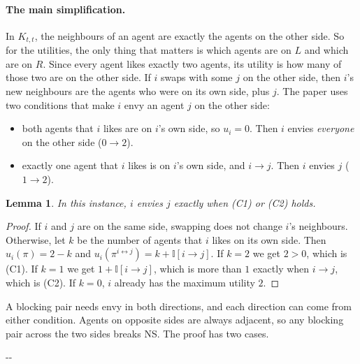 \documentclass[11pt,a4paper]{article}
\makeatletter
\newcommand{\needspace}[1]{\par\penalty-100\begingroup\setlength{\dimen@}{#1}\dimen@ii\pagegoal\advance\dimen@ii-\pagetotal\ifdim\dimen@>\dimen@ii\ifdim\dimen@ii>\z@\vfil\fi\penalty-\@M\fi\endgroup}
\theoremstyle{definition}
\theoremstyle{remark}
\theoremstyle{plain}
\newtheorem*{ourlemma}{Lemma}
\makeatother
\begin{document}
\paragraph{The main simplification.} In $K_{t,t}$, the neighbours of an agent are exactly the agents on the other side. So for the utilities, the only thing that matters is which agents are on $L$ and which are on $R$. Since every agent likes exactly two agents, its utility is how many of those two are on the other side. If $i$ swaps with some $j$ on the other side, then $i$'s new neighbours are the agents who were on its own side, plus $j$. The paper uses two conditions that make $i$ envy an agent $j$ on the other side:
\begin{itemize}
  \item[(C1)] both agents that $i$ likes are on $i$'s own side, so $u_i=0$. Then $i$ envies \emph{everyone} on the other side ($0\to2$).
  \item[(C2)] exactly one agent that $i$ likes is on $i$'s own side, and $i\to j$. Then $i$ envies $j$ ($1\to2$).
\end{itemize}

\begin{ourlemma}
In this instance, $i$ envies $j$ exactly when (C1) or (C2) holds.
\end{ourlemma}
\begin{proof}
If $i$ and $j$ are on the same side, swapping does not change $i$'s neighbours. Otherwise, let $k$ be the number of agents that $i$ likes on its own side. Then $u_i(\pi)=2-k$ and $u_i(\pi^{i\leftrightarrow j})=k+\mathbb{I}[i\to j]$. If $k=2$ we get $2>0$, which is (C1). If $k=1$ we get $1+\mathbb{I}[i\to j]$, which is more than $1$ exactly when $i\to j$, which is (C2). If $k=0$, $i$ already has the maximum utility $2$.
\end{proof}

A blocking pair needs envy in both directions, and each direction can come from either condition. Agents on opposite sides are always adjacent, so any blocking pair across the two sides breaks NS. The proof has two cases.

\needspace{6\baselineskip}
\end{document}
